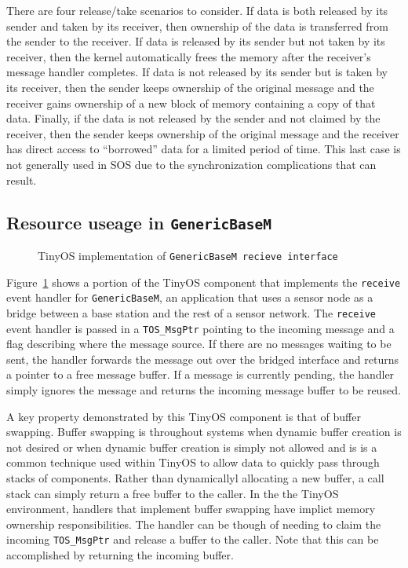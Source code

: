 There are four release/take scenarios to consider.  If data is both
released by its sender and taken by its receiver, then ownership of
the data is transferred from the sender to the receiver.  If data is
released by its sender but not taken by its receiver, then the kernel
automatically frees the memory after the receiver's message handler
completes.  If data is not released by its sender but is taken by its
receiver, then the sender keeps ownership of the original message and
the receiver gains ownership of a new block of memory containing a
copy of that data.  Finally, if the data is not released by the sender
and not claimed by the receiver, then the sender keeps ownership of
the original message and the receiver has direct access to
``borrowed'' data for a limited period of time.  This last case is not
generally used in SOS due to the synchronization complications that
can result.


\subsection{Resource useage in {\tt GenericBaseM}}

\begin{figure}[t]

\caption{TinyOS implementation of {\tt GenericBaseM recieve
interface}\label{fig:genericbase}}
\end{figure}


Figure~\ref{fig:genericbase} shows a portion of the TinyOS component
that implements the {\tt receive} event handler for {\tt GenericBaseM},
an application that uses a sensor node as a bridge between a base
station and the rest of a sensor network.  The {\tt receive} event
handler is passed in a {\tt TOS\_MsgPtr} pointing to the incoming
message and a flag describing where the message source.  If there are
no messages waiting to be sent, the handler forwards the message out
over the bridged interface and returns a pointer to a free message
buffer.  If a message is currently pending, the handler simply ignores
the message and returns the incoming message buffer to be reused.

A key property demonstrated by this TinyOS component is that of buffer
swapping.  Buffer swapping is throughout systems when dynamic buffer
creation is not desired or when dynamic buffer creation is simply not
allowed and is is a common technique used within TinyOS to allow data
to quickly pass through stacks of components.  Rather than
dynamicallyl allocating a new buffer, a call stack can simply return a
free buffer to the caller.  In the the TinyOS environment, handlers
that implement buffer swapping have implict memory ownership
responsibilities.  The handler can be though of needing to claim the
incoming {\tt TOS\_MsgPtr} and release a buffer to the caller.  Note
that this can be accomplished by returning the incoming buffer.


